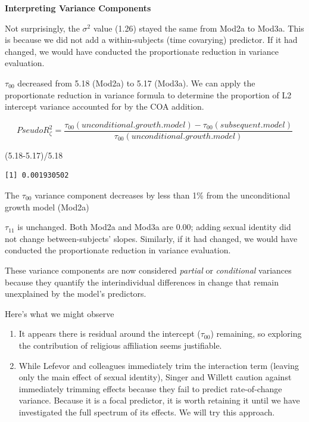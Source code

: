 \documentclass[
  english,
]{book}
\newenvironment{Shaded}{\begin{snugshade}}{\end{snugshade}}
\newcommand{\FloatTok}[1]{\textcolor[rgb]{0.00,0.00,0.81}{#1}}
\newcommand{\NormalTok}[1]{#1}
\newcommand{\SpecialCharTok}[1]{\textcolor[rgb]{0.00,0.00,0.00}{#1}}
\providecommand{\tightlist}{%
  \setlength{\itemsep}{0pt}\setlength{\parskip}{0pt}}
\begin{document}
\textbf{Interpreting Variance Components}

Not surprisingly, the \(\sigma ^{2}\) value (1.26) stayed the same from Mod2a to Mod3a. This is because we did not add a within-subjects (time covarying) predictor. If it had changed, we would have conducted the proportionate reduction in variance evaluation.

\(\tau _{00}\) decreased from 5.18 (Mod2a) to 5.17 (Mod3a). We can apply the proportionate reduction in variance formula to determine the proportion of L2 intercept variance accounted for by the COA addition.

\[Pseudo R_{\zeta }^{2} = \frac{\tau _{00} (unconditional. growth. model) - \tau _{00}(subsequent. model)}{\tau _{00}(unconditional. growth. model)}\]

\begin{Shaded}
\begin{Highlighting}[]
\NormalTok{(}\FloatTok{5.18{-}5.17}\NormalTok{)}\SpecialCharTok{/}\FloatTok{5.18}
\end{Highlighting}
\end{Shaded}

\begin{verbatim}
[1] 0.001930502
\end{verbatim}

The \(\tau _{00}\) variance component decreases by less than 1\% from the unconditional growth model (Mod2a)

\(\tau _{11}\) is unchanged. Both Mod2a and Mod3a are 0.00; adding sexual identity did not change between-subjects' slopes. Similarly, if it had changed, we would have conducted the proportionate reduction in variance evaluation.

These variance components are now considered \emph{partial} or \emph{conditional} variances because they quantify the interindividual differences in change that remain unexplained by the model's predictors.

Here's what we might observe

\begin{enumerate}
\def\labelenumi{\arabic{enumi}.}
\tightlist
\item
  It appears there is residual around the intercept (\(\tau _{00}\)) remaining, so exploring the contribution of religious affiliation seems justifiable.
\item
  While Lefevor and colleagues \citeyearpar{lefevor_religious_2017} immediately trim the interaction term (leaving only the main effect of sexual identity), Singer and Willett \citeyearpar{singer_applied_2003} caution against immediately trimming effects because they fail to predict rate-of-change variance. Because it is a focal predictor, it is worth retaining it until we have investigated the full spectrum of its effects. We will try this approach.
\end{enumerate}
\end{document}

